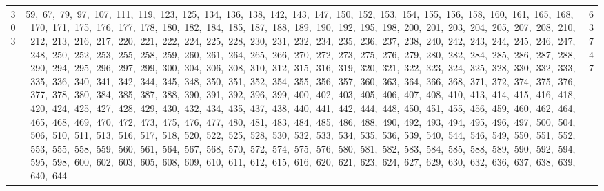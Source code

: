 \begin{longtable}{c|p{}|r}
303 & 59,\ 67,\ 79,\ 97,\ 107,\ 111,\ 119,\ 123,\ 125,\ 134,\ 136,\ 138,\ 142,\ 143,\ 147,\ 150,\ 152,\ 153,\ 154,\ 155,\ 156,\ 158,\ 160,\ 161,\ 165,\ 168,\ 170,\ 171,\ 175,\ 176,\ 177,\ 178,\ 180,\ 182,\ 184,\ 185,\ 187,\ 188,\ 189,\ 190,\ 192,\ 195,\ 198,\ 200,\ 201,\ 203,\ 204,\ 205,\ 207,\ 208,\ 210,\ 212,\ 213,\ 216,\ 217,\ 220,\ 221,\ 222,\ 224,\ 225,\ 228,\ 230,\ 231,\ 232,\ 234,\ 235,\ 236,\ 237,\ 238,\ 240,\ 242,\ 243,\ 244,\ 245,\ 246,\ 247,\ 248,\ 250,\ 252,\ 253,\ 255,\ 258,\ 259,\ 260,\ 261,\ 264,\ 265,\ 266,\ 270,\ 272,\ 273,\ 275,\ 276,\ 279,\ 280,\ 282,\ 284,\ 285,\ 286,\ 287,\ 288,\ 290,\ 294,\ 295,\ 296,\ 297,\ 299,\ 300,\ 304,\ 306,\ 308,\ 310,\ 312,\ 315,\ 316,\ 319,\ 320,\ 321,\ 322,\ 323,\ 324,\ 325,\ 328,\ 330,\ 332,\ 333,\ 335,\ 336,\ 340,\ 341,\ 342,\ 344,\ 345,\ 348,\ 350,\ 351,\ 352,\ 354,\ 355,\ 356,\ 357,\ 360,\ 363,\ 364,\ 366,\ 368,\ 371,\ 372,\ 374,\ 375,\ 376,\ 377,\ 378,\ 380,\ 384,\ 385,\ 387,\ 388,\ 390,\ 391,\ 392,\ 396,\ 399,\ 400,\ 402,\ 403,\ 405,\ 406,\ 407,\ 408,\ 410,\ 413,\ 414,\ 415,\ 416,\ 418,\ 420,\ 424,\ 425,\ 427,\ 428,\ 429,\ 430,\ 432,\ 434,\ 435,\ 437,\ 438,\ 440,\ 441,\ 442,\ 444,\ 448,\ 450,\ 451,\ 455,\ 456,\ 459,\ 460,\ 462,\ 464,\ 465,\ 468,\ 469,\ 470,\ 472,\ 473,\ 475,\ 476,\ 477,\ 480,\ 481,\ 483,\ 484,\ 485,\ 486,\ 488,\ 490,\ 492,\ 493,\ 494,\ 495,\ 496,\ 497,\ 500,\ 504,\ 506,\ 510,\ 511,\ 513,\ 516,\ 517,\ 518,\ 520,\ 522,\ 525,\ 528,\ 530,\ 532,\ 533,\ 534,\ 535,\ 536,\ 539,\ 540,\ 544,\ 546,\ 549,\ 550,\ 551,\ 552,\ 553,\ 555,\ 558,\ 559,\ 560,\ 561,\ 564,\ 567,\ 568,\ 570,\ 572,\ 574,\ 575,\ 576,\ 580,\ 581,\ 582,\ 583,\ 584,\ 585,\ 588,\ 589,\ 590,\ 592,\ 594,\ 595,\ 598,\ 600,\ 602,\ 603,\ 605,\ 608,\ 609,\ 610,\ 611,\ 612,\ 615,\ 616,\ 620,\ 621,\ 623,\ 624,\ 627,\ 629,\ 630,\ 632,\ 636,\ 637,\ 638,\ 639,\ 640,\ 644 & 63747 \\

\end{longtable}
